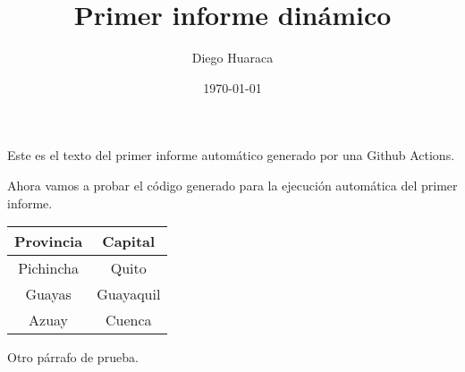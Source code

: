 \documentclass[12pt, a4paper]{book}
\title{Primer informe dinámico}
\author{Diego Huaraca}
\date{\today}
\begin{document}
\maketitle

Este es el texto del primer informe automático generado por una Github Actions.\newline

Ahora vamos a probar el código generado para la ejecución automática del primer informe.

\begin{table}[H]
\centering
\begin{tabular}{|c|c|}\hline
\textbf{Provincia} & \textbf{Capital}\\ \hline
Pichincha & Quito\\ \hline
Guayas & Guayaquil\\ \hline
Azuay & Cuenca\\ \hline
\end{tabular}
\end{table}

Otro párrafo de prueba.
\end{document}
